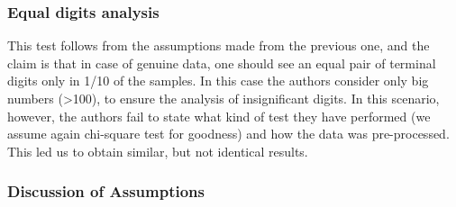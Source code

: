 \documentclass{article}
\begin{document}
\subsubsection{Equal digits analysis}\label{equal-digits-analysis}

This test follows from the assumptions made from the previous one, and the claim is that in case of genuine data, one should see an equal
pair of terminal digits only in 1/10 of the samples. In this case the
authors consider only big numbers (\textgreater{}100), to ensure the
analysis of insignificant digits. In this scenario, however,
the authors fail to state what kind of test they have performed (we
assume again chi-square test for goodness) and how the data was
pre-processed. This led us to obtain similar, but not identical results.



\subsubsection{Discussion of
Assumptions}\label{discussion-of-assumptions}
\end{document}
